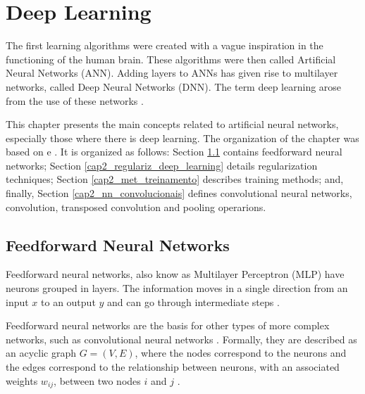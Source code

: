 \chapter{Deep Learning}
\label{cap2_redes_neurais}

The first learning algorithms were created with a vague inspiration in the functioning of the human brain.
These algorithms were then called Artificial Neural Networks (\ac{ANN}).
Adding layers to \ac{ANNs} has given rise to multilayer networks, called Deep Neural Networks (\ac{DNN}). 
The term deep learning arose from the use of these networks \cite[Ch. 6]{Goodfellow2016} \cite{ShalevShwartz:2014:UML:2621980}.

This chapter presents the main concepts related to artificial neural networks, especially those where there is deep learning.
The organization of the chapter was based on  e . 
It is organized as follows: Section \ref{cap2_nn_feedforward} contains feedforward neural networks; Section \ref{cap2_regulariz_deep_learning} details regularization techniques; Section \ref{cap2_met_treinamento} describes training methods; and, finally, Section \ref{cap2_nn_convolucionais} defines convolutional neural networks, convolution, transposed convolution and pooling operarions.

\section{Feedforward Neural Networks}
\label{cap2_nn_feedforward}

Feedforward neural networks, also know as Multilayer Perceptron (\ac{MLP}) have neurons grouped in layers.
The information moves in a single direction from an input $x$ to an output $y$ and can go through intermediate steps \cite[Ch. 6]{Goodfellow2016}.

Feedforward neural networks are the basis for other types of more complex networks, such as convolutional neural networks \cite[Ch. 6]{Goodfellow2016}. 
Formally, they are described as an acyclic graph $G=(V,E)$, where the nodes correspond to the neurons and the edges correspond to the relationship between neurons, with an associated weights $w_{ij}$, between two nodes $i$ and $j$ \cite{ShalevShwartz:2014:UML:2621980}.

